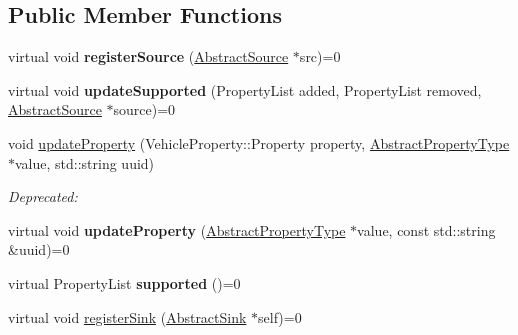 \subsection*{Public Member Functions}
\begin{DoxyCompactItemize}
\item 
\hypertarget{classAbstractRoutingEngine_ad88ea00def2bb5991f5b2b424acab6c8}{virtual void {\bfseries register\-Source} (\hyperlink{classAbstractSource}{Abstract\-Source} $\ast$src)=0}\label{classAbstractRoutingEngine_ad88ea00def2bb5991f5b2b424acab6c8}

\item 
\hypertarget{classAbstractRoutingEngine_a177588ad6d45f477f596eb025dcc8bed}{virtual void {\bfseries update\-Supported} (Property\-List added, Property\-List removed, \hyperlink{classAbstractSource}{Abstract\-Source} $\ast$source)=0}\label{classAbstractRoutingEngine_a177588ad6d45f477f596eb025dcc8bed}

\item 
\hypertarget{classAbstractRoutingEngine_adadf5f60f3895bdb90bb224d05ee97f0}{void \hyperlink{classAbstractRoutingEngine_adadf5f60f3895bdb90bb224d05ee97f0}{update\-Property} (Vehicle\-Property\-::\-Property property, \hyperlink{classAbstractPropertyType}{Abstract\-Property\-Type} $\ast$value, std\-::string uuid)}\label{classAbstractRoutingEngine_adadf5f60f3895bdb90bb224d05ee97f0}

\begin{DoxyCompactList}\small\item\em Deprecated\-: \end{DoxyCompactList}\item 
\hypertarget{classAbstractRoutingEngine_a2395e520ddfd532959706a5122998fbb}{virtual void {\bfseries update\-Property} (\hyperlink{classAbstractPropertyType}{Abstract\-Property\-Type} $\ast$value, const std\-::string \&uuid)=0}\label{classAbstractRoutingEngine_a2395e520ddfd532959706a5122998fbb}

\item 
\hypertarget{classAbstractRoutingEngine_adcd80e2e3823af7101c5d1f7ff0c217c}{virtual Property\-List {\bfseries supported} ()=0}\label{classAbstractRoutingEngine_adcd80e2e3823af7101c5d1f7ff0c217c}

\item 
\hypertarget{classAbstractRoutingEngine_a179052d9ab3f70ddb4c91421f94c45a9}{virtual void \hyperlink{classAbstractRoutingEngine_a179052d9ab3f70ddb4c91421f94c45a9}{register\-Sink} (\hyperlink{classAbstractSink}{Abstract\-Sink} $\ast$self)=0}\label{classAbstractRoutingEngine_a179052d9ab3f70ddb4c91421f94c45a9}


\end{DoxyCompactItemize}
